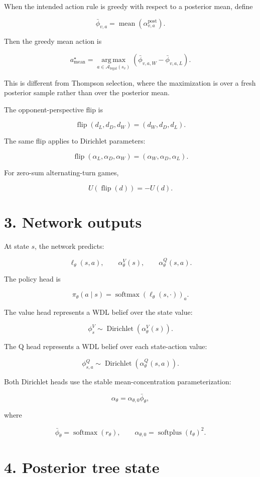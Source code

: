 \documentclass[11pt]{article}
\newcommand{\Dir}{\operatorname{Dirichlet}}
\newcommand{\softmax}{\operatorname{softmax}}
\newcommand{\softplus}{\operatorname{softplus}}
\newcommand{\argmax}{\operatorname*{arg\,max}}
\newcommand{\mean}{\operatorname{mean}}
\newcommand{\Legal}{\mathcal{A}_{\mathrm{legal}}}
\newcommand{\Flip}{\operatorname{flip}}
\newcommand{\Utility}{U}
\begin{document}
When the intended action rule is greedy with respect to a posterior mean, define

\[
\bar\phi_{v,a}
=
\mean
\left(
\alpha^{\mathrm{post}}_{v,a}
\right).
\]

Then the greedy mean action is

\[
a^{\star}_{\mathrm{mean}}
=
\argmax_{a\in\Legal(s_v)}
\left(
\bar\phi_{v,a,W}-\bar\phi_{v,a,L}
\right).
\]

This is different from Thompson selection, where the maximization is over a
fresh posterior sample rather than over the posterior mean.

The opponent-perspective flip is

\[
\Flip(d_L,d_D,d_W)
=
(d_W,d_D,d_L).
\]

The same flip applies to Dirichlet parameters:

\[
\Flip(\alpha_L,\alpha_D,\alpha_W)
=
(\alpha_W,\alpha_D,\alpha_L).
\]

For zero-sum alternating-turn games,

\[
\Utility(\Flip(d)) = -\Utility(d).
\]

\section*{3. Network outputs}

At state \(s\), the network predicts:

\[
\ell_\theta(s,a),
\qquad
\alpha_\theta^V(s),
\qquad
\alpha_\theta^Q(s,a).
\]

The policy head is

\[
\pi_\theta(a \mid s)
=
\softmax(\ell_\theta(s,\cdot))_a.
\]

The value head represents a WDL belief over the state value:

\[
\phi_s^V
\sim
\Dir(\alpha_\theta^V(s)).
\]

The Q head represents a WDL belief over each state-action value:

\[
\phi_{s,a}^Q
\sim
\Dir(\alpha_\theta^Q(s,a)).
\]

Both Dirichlet heads use the stable mean-concentration parameterization:

\[
\alpha_\theta
=
\alpha_{\theta,0}\bar{\phi}_\theta,
\]

where

\[
\bar{\phi}_\theta = \softmax(r_\theta),
\qquad
\alpha_{\theta,0} = \softplus(t_\theta)^2.
\]

\section*{4. Posterior tree state}
\end{document}
